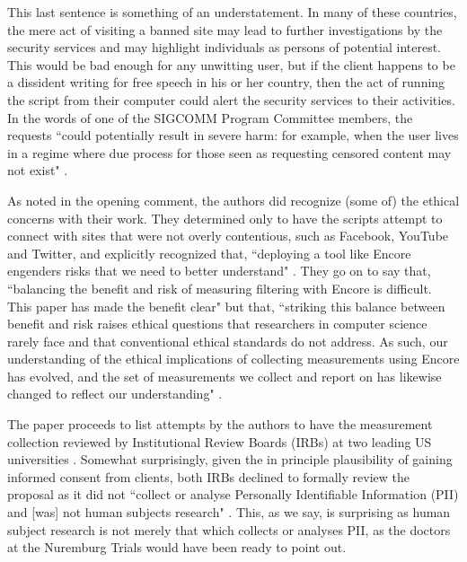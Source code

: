 \documentclass{svjour3}                     %
\begin{document}
This last sentence is something of an understatement.  In many of these countries, the mere act of visiting a banned site may lead to further investigations by the security services and may highlight individuals as persons of potential interest.  This would be bad enough for any unwitting user, but if the client happens to be a dissident writing for free speech in his or her country, then the act of running the script from their computer could alert the security services to their activities. In the words of one of the SIGCOMM Program Committee members, the requests ``could potentially result in severe harm: for example, when the user lives in a regime where due process for those seen as requesting censored content may not exist" \cite{byers2015encore}.

As noted in the opening comment, the authors did recognize (some of) the ethical concerns with their work.  They determined only to have the scripts attempt to connect with sites that were not overly contentious, such as Facebook, YouTube and Twitter, and explicitly recognized that, ``deploying a tool like Encore engenders risks that we need to better understand" \cite[p.~663]{burnett2015encore}. They go on to say that, ``balancing the benefit and risk of measuring filtering with Encore is difficult. This paper has made the benefit clear" but that, ``striking this balance between benefit and risk raises ethical questions that researchers in computer science rarely face and that conventional ethical standards do not address. As such, our understanding of the ethical implications of collecting measurements using Encore has evolved, and the set of measurements we collect and report on has likewise changed to reflect our understanding" \cite[p.~663]{burnett2015encore}.

The paper proceeds to list attempts by the authors to have the measurement collection reviewed by Institutional Review Boards (IRBs) at two leading US universities \cite[Table 2,~p.~662]{burnett2015encore}. Somewhat surprisingly, given the in principle plausibility of gaining informed consent from clients, both IRBs declined to formally review the proposal as it did not ``collect or analyse Personally Identifiable Information (PII) and [was] not human subjects research" \cite[p.~664]{burnett2015encore}. This, as we say, is surprising as human subject research is not merely that which collects or analyses PII, as the doctors at the Nuremburg Trials would have been ready to point out.
\end{document}
